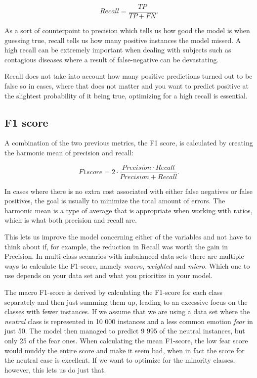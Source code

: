 \documentclass[nofilelist]{cslthse-msc}
\begin{document}
$$ Recall =\frac{TP}{TP + FN}.$$

As a sort of counterpoint to precision which tells us how good the model is when guessing true, recall tells us how many positive instances the model missed. A high recall can be extremely important when dealing with subjects such as contagious diseases where a result of false-negative can be devastating. 

Recall does not take into account how many positive predictions turned out to be false so in cases, where that does not matter and you want to predict positive at the slightest probability of it being true, optimizing for a high recall is essential.


\subsection{F1 score}
A combination of the two previous metrics, the F1 score, is calculated by creating the harmonic mean of precision and recall:

$$ F1score = 2 \cdot \frac{Precision \cdot Recall}{Precision + Recall}.$$

In cases where there is no extra cost associated with either false negatives or false positives, the goal is usually to minimize the total amount of errors. The harmonic mean is a type of average that is appropriate when working with ratios, which is what both precision and recall are. 

This lets us improve the model concerning either of the variables and not have to think about if, for example, the reduction in Recall was worth the gain in Precision. In multi-class scenarios with imbalanced data sets there are multiple ways to calculate the F1-score, namely \textit{macro}, \textit{weighted} and \textit{micro}. Which one to use depends on your data set and what you prioritize in your model. 

The macro F1-score is derived by calculating the F1-score for each class separately and then just summing them up, leading to an excessive focus on the classes with fewer instances. If we assume that we are using a data set where the \textit{neutral} class is represented in 10 000 instances and a less common emotion \textit{fear} in just 50. The model then managed to predict 9 995 of the neutral instances, but only 25 of the fear ones. When calculating the mean F1-score, the low fear score would muddy the entire score and make it seem bad, when in fact the score for the neutral case is excellent. If we want to optimize for the minority classes, however, this lets us do just that. 
\end{document}
